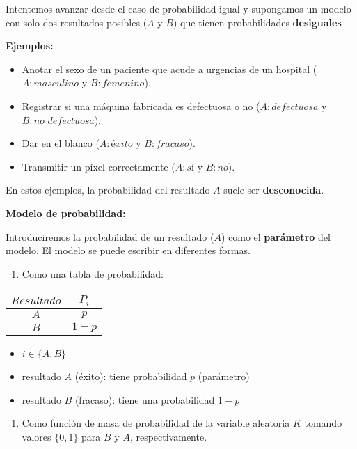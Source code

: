 \documentclass[
]{book}
\providecommand{\tightlist}{%
  \setlength{\itemsep}{0pt}\setlength{\parskip}{0pt}}
\begin{document}
Intentemos avanzar desde el caso de probabilidad igual y supongamos un modelo con solo dos resultados posibles (\(A\) y \(B\)) que tienen probabilidades \textbf{desiguales}

\textbf{Ejemplos:}

\begin{itemize}
\item
  Anotar el sexo de un paciente que acude a urgencias de un hospital (\(A:masculino\) y \(B:femenino\)).
\item
  Registrar si una máquina fabricada es defectuosa o no (\(A:defectuosa\) y \(B:no\,\,defectuosa\)).
\item
  Dar en el blanco (\(A:éxito\) y \(B:fracaso\)).
\item
  Transmitir un píxel correctamente (\(A:sí\) y \(B:no\)).
\end{itemize}

En estos ejemplos, la probabilidad del resultado \(A\) suele ser \textbf{desconocida}.

\textbf{Modelo de probabilidad:}

Introduciremos la probabilidad de un resultado (\(A\)) como el \textbf{parámetro} del modelo. El modelo se puede escribir en diferentes formas.

\begin{enumerate}
\def\labelenumi{\arabic{enumi})}
\tightlist
\item
  Como una tabla de probabilidad:
\end{enumerate}

\begin{longtable}[]{@{}cc@{}}
\toprule
\(Resultado\) & \(P_i\) \\
\midrule
\endhead
\(A\) & \(p\) \\
\(B\) & \(1-p\) \\
\bottomrule
\end{longtable}

\begin{itemize}
\tightlist
\item
  \(i \in \{A,B\}\)
\item
  resultado \(A\) (éxito): tiene probabilidad \(p\) (parámetro)
\item
  resultado \(B\) (fracaso): tiene una probabilidad \(1-p\)
\end{itemize}

\begin{enumerate}
\def\labelenumi{\arabic{enumi})}
\setcounter{enumi}{1}
\tightlist
\item
  Como función de masa de probabilidad de la variable aleatoria \(K\) tomando valores \(\{0, 1\}\) para \(B\) y \(A\), respectivamente.
\end{enumerate}
\end{document}
